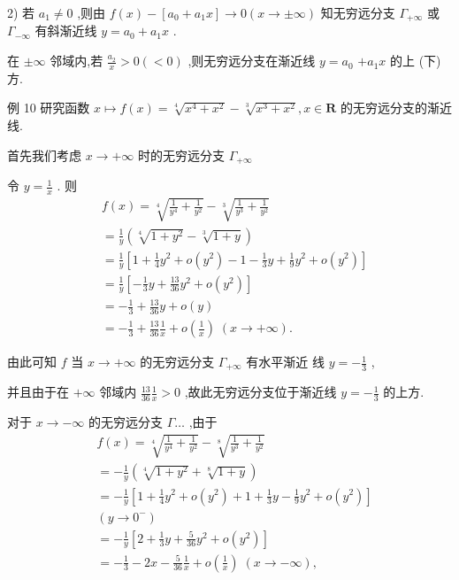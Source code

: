 2) 若 ${a}_{1} \neq  0$ ,则由 $f\left( x\right)  - \left\lbrack  {{a}_{0} + {a}_{1}x}\right\rbrack   \rightarrow  0\left( {x \rightarrow   \pm  \infty }\right)$ 知无穷远分支 ${\Gamma }_{+\infty }$ 或 ${\Gamma }_{-\infty }$ 有斜渐近线 $y = {a}_{0} + {a}_{1}x$ .

在 $\pm  \infty$ 邻域内,若 $\frac{{a}_{2}}{x} > 0\left( { < 0}\right)$ ,则无穷远分支在渐近线 $y = {a}_{0}$  $+ {a}_{1}x$ 的上 (下) 方.

例 10 研究函数 $x \mapsto  f\left( x\right)  = \sqrt[4]{{x}^{4} + {x}^{2}} - \sqrt[3]{{x}^{3} + {x}^{2}},x \in  \mathbf{R}$ 的无穷远分支的渐近线.

首先我们考虑 $x \rightarrow   + \infty$ 时的无穷远分支 ${\Gamma }_{+\infty }$

令 $y = \frac{1}{x}$ . 则
\begin{align*}
	&f\left( x\right)  = \sqrt[4]{\frac{1}{{y}^{4}} + \frac{1}{{y}^{2}}} - \sqrt[3]{\frac{1}{{y}^{3}} + \frac{1}{{y}^{2}}}\\
	&= \frac{1}{y}\left( {\sqrt[4]{1 + {y}^{2}} - \sqrt[3]{1 + y}}\right)\\
	&= \frac{1}{y}\left\lbrack  {1 + \frac{1}{4}{y}^{2} + o\left( {y}^{2}\right)  - 1 - \frac{1}{3}y + \frac{1}{9}{y}^{2} + o\left( {y}^{2}\right) }\right\rbrack\\
	&= \frac{1}{y}\left\lbrack  {-\frac{1}{3}y + \frac{13}{36}{y}^{2} + o\left( {y}^{2}\right) }\right\rbrack\\
	&=  - \frac{1}{3} + \frac{13}{36}y + o\left( y\right)\\
	&=  - \frac{1}{3} + \frac{13}{36}\frac{1}{x} + o\left( \frac{1}{x}\right) \;\left( {x \rightarrow   + \infty }\right) .
\end{align*}

由此可知 $f$ 当 $x \rightarrow   + \infty$ 的无穷远分支 ${\Gamma }_{+\infty }$ 有水平渐近 线 $y =  - \frac{1}{3}$ ,

并且由于在 $+ \infty$ 邻域内 $\frac{13}{36}\frac{1}{x} > 0$ ,故此无穷远分支位于渐近线 $y =  - \frac{1}{3}$ 的上方.

对于 $x \rightarrow   - \infty$ 的无穷远分支 $\Gamma \ldots$ ,由于
\begin{align*}
	&f\left( x\right)  = \sqrt[4]{\frac{1}{{y}^{4}} + \frac{1}{{y}^{2}}} - \sqrt[8]{\frac{1}{{y}^{3}} + \frac{1}{{y}^{2}}}\\
	&=  - \frac{1}{y}\left( {\sqrt[4]{1 + {y}^{2}} + \sqrt[8]{1 + y}}\right)\\
	&=  - \frac{1}{y}\left\lbrack  {1 + \frac{1}{4}{y}^{2} + o\left( {y}^{2}\right)  + 1 + \frac{1}{3}y - \frac{1}{9}{y}^{2} + o\left( {y}^{2}\right) }\right\rbrack\\
	&\left( {y \rightarrow  {0}^{ - }}\right)\\
	&=  - \frac{1}{y}\left\lbrack  {2 + \frac{1}{3}y + \frac{5}{36}{y}^{2} + o\left( {y}^{2}\right) }\right\rbrack\\
	&=  - \frac{1}{3} - {2x} - \frac{5}{36}\frac{1}{x} + o\left( \frac{1}{x}\right) \;\left( {x \rightarrow   - \infty }\right) ,
\end{align*}


